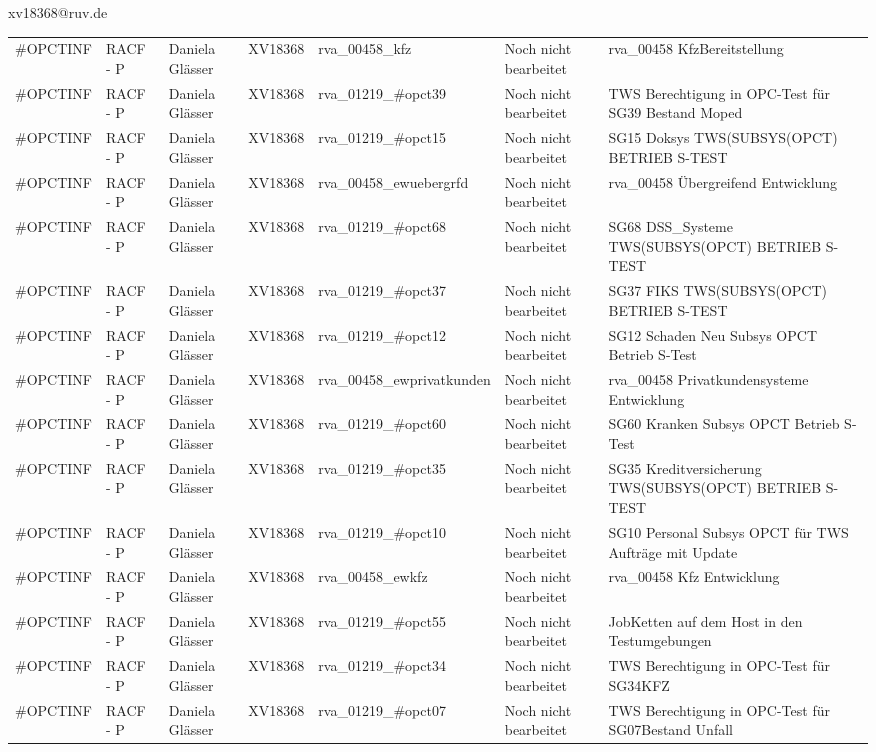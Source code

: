 \documentclass[a4paper,landscape,12pt]{letter}
\begin{document}
\begin{letter}{xv18368@ruv.de\hfill \break}
\begin{tiny}
\begin{longtable}{|p{35mm}|p{15mm}|p{25mm}|p{10mm}|p{40mm}|p{50mm}|p{50mm}|}
\#OPCTINF & RACF - P & Daniela Glässer & XV18368 & rva\_00458\_kfz & Noch nicht bearbeitet & rva\_00458 KfzBereitstellung \\
\#OPCTINF & RACF - P & Daniela Glässer & XV18368 & rva\_01219\_\#opct39 & Noch nicht bearbeitet & TWS Berechtigung in OPC-Test für SG39 Bestand Moped \\
\#OPCTINF & RACF - P & Daniela Glässer & XV18368 & rva\_01219\_\#opct15 & Noch nicht bearbeitet & SG15 Doksys TWS(SUBSYS(OPCT) BETRIEB S-TEST \\
\#OPCTINF & RACF - P & Daniela Glässer & XV18368 & rva\_00458\_ewuebergrfd & Noch nicht bearbeitet & rva\_00458 Übergreifend Entwicklung \\
\#OPCTINF & RACF - P & Daniela Glässer & XV18368 & rva\_01219\_\#opct68 & Noch nicht bearbeitet & SG68 DSS\_Systeme TWS(SUBSYS(OPCT) BETRIEB S-TEST \\
\#OPCTINF & RACF - P & Daniela Glässer & XV18368 & rva\_01219\_\#opct37 & Noch nicht bearbeitet & SG37 FIKS TWS(SUBSYS(OPCT) BETRIEB S-TEST \\
\#OPCTINF & RACF - P & Daniela Glässer & XV18368 & rva\_01219\_\#opct12 & Noch nicht bearbeitet & SG12 Schaden Neu Subsys OPCT Betrieb S-Test \\
\#OPCTINF & RACF - P & Daniela Glässer & XV18368 & rva\_00458\_ewprivatkunden & Noch nicht bearbeitet & rva\_00458 Privatkundensysteme Entwicklung \\
\#OPCTINF & RACF - P & Daniela Glässer & XV18368 & rva\_01219\_\#opct60 & Noch nicht bearbeitet & SG60 Kranken Subsys OPCT Betrieb S-Test \\
\#OPCTINF & RACF - P & Daniela Glässer & XV18368 & rva\_01219\_\#opct35 & Noch nicht bearbeitet & SG35 Kreditversicherung TWS(SUBSYS(OPCT) BETRIEB S-TEST \\
\#OPCTINF & RACF - P & Daniela Glässer & XV18368 & rva\_01219\_\#opct10 & Noch nicht bearbeitet & SG10 Personal Subsys OPCT für TWS Aufträge mit Update \\
\#OPCTINF & RACF - P & Daniela Glässer & XV18368 & rva\_00458\_ewkfz & Noch nicht bearbeitet & rva\_00458 Kfz Entwicklung \\
\#OPCTINF & RACF - P & Daniela Glässer & XV18368 & rva\_01219\_\#opct55 & Noch nicht bearbeitet & JobKetten auf dem Host in den Testumgebungen \\
\#OPCTINF & RACF - P & Daniela Glässer & XV18368 & rva\_01219\_\#opct34 & Noch nicht bearbeitet & TWS Berechtigung in OPC-Test für SG34KFZ \\
\#OPCTINF & RACF - P & Daniela Glässer & XV18368 & rva\_01219\_\#opct07 & Noch nicht bearbeitet & TWS Berechtigung in OPC-Test für SG07Bestand Unfall \\

\end{longtable}
\end{tiny}
\end{letter}
\end{document}
